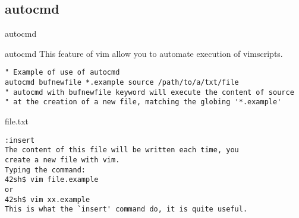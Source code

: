 \documentclass{beamer}
\begin{document}
\subsection*{autocmd}
\begin{frame}[fragile]{autocmd}
  \begin{block}{autocmd}
  This feature of vim allow you to automate execution of vimscripts.
    \begin{verbatim}
" Example of use of autocmd
autocmd bufnewfile *.example source /path/to/a/txt/file
" autocmd with bufnewfile keyword will execute the content of source
" at the creation of a new file, matching the globing '*.example'
    \end{verbatim}
  \end{block}
  \begin{block}{file.txt}
\begin{verbatim}
:insert
The content of this file will be written each time, you
create a new file with vim.
Typing the command:
42sh$ vim file.example
or
42sh$ vim xx.example
This is what the `insert' command do, it is quite useful.
\end{verbatim}
  \end{block}
\end{frame}

\end{document}
